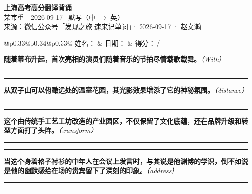 \documentclass[11pt,a4paper]{article}
\newcommand{\num}[1]{\makebox[1.9em][r]{#1.}\hspace{0.3em}}
\newcommand{\wline}{\noindent\rule{\linewidth}{0.4pt}}
\newcommand{\prompt}[1]{\emph{\textcolor{tipblue}{\small（#1）}}}
\begin{document}
\pagestyle{plain}
\begin{center}
{\LARGE\bfseries 上海高考高分翻译背诵 }\\[0.25em]
{\large 某市重　2026-09-17 \quad\ 默写（中 $\to$ 英）}\\[0.35em]
{\footnotesize 来源：微信公众号「发现之旅 速来记单词」· 2026-09-17 · 赵文瀚}
\end{center}

\vspace{0.4em}
\noindent\begin{tabular}{@{}p{0.33\textwidth}@{}p{0.34\textwidth}@{}p{0.33\textwidth}@{}}
姓名：\underline{\hspace{2.0cm}} & 日期：\underline{\hspace{2.0cm}} & 得分：\underline{\hspace{1.4cm}}\,/ \\
\end{tabular}

\vspace{0.5em}

\vspace{0.8em}
\num{1}\textbf{随着幕布升起，首次亮相的演员们随着音乐的节拍尽情载歌载舞。}\prompt{With}

\vspace{0.3em}

\wline\vspace{0.3em}
\wline

\num{2}\textbf{从双子山可以俯瞰远处的温室花园，其光影效果增添了它的神秘氛围。}\prompt{distance}

\vspace{0.3em}

\wline\vspace{0.3em}
\wline

\num{3}\textbf{这个由传统手工艺工坊改造的产业园区，不仅保留了文化底蕴，还在品牌升级和转型方面打了头阵。}\prompt{transform}

\vspace{0.3em}

\wline\vspace{0.3em}
\wline

\num{4}\textbf{当这个身着格子衬衫的中年人在会议上发言时，与其说是他渊博的学识，倒不如说是他的幽默感给在场的贵宾留下了深刻的印象。}\prompt{address}

\vspace{0.3em}

\wline\vspace{0.3em}
\wline
\end{document}
